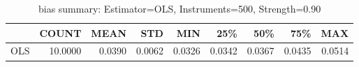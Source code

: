 \begin{table}[ht]
\centering
\caption{bias summary: Estimator=OLS, Instruments=500, Strength=0.90}
\begin{tabular}{lrrrrrrrr}
\toprule
 & COUNT & MEAN & STD & MIN & 25\% & 50\% & 75\% & MAX \\
\midrule
OLS & 10.0000 & 0.0390 & 0.0062 & 0.0326 & 0.0342 & 0.0367 & 0.0435 & 0.0514 \\
\bottomrule
\end{tabular}
\end{table}
